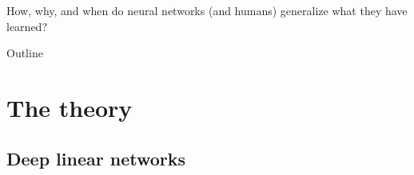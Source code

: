 \documentclass{beamer}
\begin{document}
\begin{frame}[standout]
How, why, and when do neural networks (and humans) generalize what they have learned?
\end{frame}

\begin{frame}{Outline}
\vspace{1em}
\tableofcontents
\end{frame}

\section{The theory}

\subsection{Deep linear networks}
\end{document}
